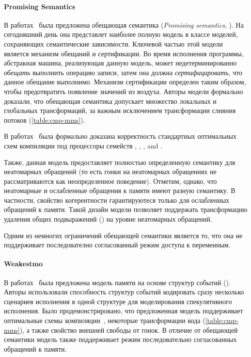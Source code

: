 \paragraph{Promising Semantics}

В работах~\cite{Kang-al:POPL17, Lee-al:PLDI20} была предложена 
обещающая семантика (\emph{Promising semantics}, \PRM).
На сегодняшний день она представлет наиболее полную модель
в классе моделей, сохраняющих семантические зависимости. 
Ключевой частью этой модели является механизм обещаний и сертификации. 
Во время исполнения программы, абстракная машина, 
реализующая данную модель, может недетерминированно 
\emph{обещать} выполнить операцию записи,
затем она должна \emph{сертифицировать}, что данное обещание выполнимо. 
Механизм сертификации определен таким образом, чтобы 
предотвратить появление значений из воздуха. 
Авторы модели формально доказали, 
что обещающая семантика допускает множество 
локальных и глобальных трансформаций, 
за важным исключением трансформации слияния потоков 
(\see \cref{table:cmp-mms}).

В работах~\cite{Podkopaev-al:ECOOP17, Podkopaev-al:POPL19} 
была формально доказана корректность стандартных оптимальных 
схем компиляции под процессоры семейств \Intel, , , and \POWER.

Также, данная модель предоставляет полностью определенную 
семантику для неатомарных обращений 
(то есть гонки на неатомарных обращениях 
не рассматриваются как неопределенное поведение).
Отметим, однако, что неатомарные и ослабленные обращения 
к памяти имеют разную семантику. 
В частности, свойство когерентности гарантируютеся только 
для ослабленных обращений к памяти.
Такой дизайн модели позволяет поддержать 
трансформацию удаления общих подвыражений (\CSE)
на уровне неатомарных обращений. 

Одним из немногих ограничений обещающей семантики
является то, что она не поддерживает последователно согласованный 
режим доступа к переменным. 

\paragraph{Weakestmo}

В работах~\cite{Chakraborty-Vafeiadis:CGO17, Chakraborty-Vafeiadis:POPL19} 
была предложена модель памяти на основе структур событий (\WMO).
Авторы использовали способность структур событий кодировать
сразу несколько сценариев исполнения в одной структуре
для моделирования спекулятивного исполнения. 
Было продемонстрировано, что предложенная модель поддерживает 
оптимальные схемы компиляции~\cite{Moiseenko-al:ECOOP20}, 
некоторые трансформации кода (\see \cref{table:cmp-mms}), 
а также свойство внешней свободы от гонок. 
В отличие от обещающей семантики модель 
также поддерживает режим последовательно согласованных
обращений к памяти. 

